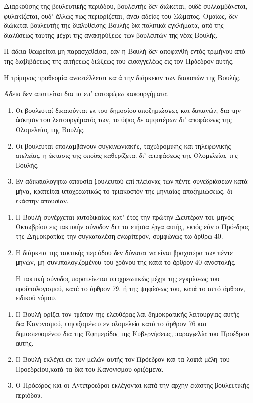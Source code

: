 \documentclass[twoside, a4paper, 10pt]{article}
\begin{document}
\begin{multicols}{2}
\begin{enumerate}
\begin{BigQuote}
Διαρκούσης της βουλευτικής περιόδου, βουλευτής δεν διώκεται, ουδέ συλλαμβάνεται, φυλακίζεται, ουδ' άλλως πως περιορίζεται, άνευ αδείας του Σώματος. Ομοίως, δεν διώκεται βουλευτής της διαλυθείσης Βουλής δια πολιτικά εγκλήματα, από της διαλύσεως ταύτης μέχρι της ανακηρύξεως των βουλευτών της νέας Βουλής.

Η άδεια θεωρείται μη παρασχεθείσα, εάν η Βουλή δεν αποφανθή εντός τριμήνου από της  διαβιβάσεως της αιτήσεως διώξεως του εισαγγελέως εις τον Πρόεδρον αυτής.

Η τρίμηνος προθεσμία αναστέλλεται κατά την διάρκειαν των διακοπών της Βουλής.

Άδεια δεν απαιτείται δια τα επ' αυτοφώρω κακουργήματα.

\begin{enumerate}
  \item[1.] Οι βουλευταί δικαιούνται εκ του δημοσίου αποζημιώσεως και δαπανών, δια την άσκησιν  του λειτουργήματός των, το ύψος δε αμφοτέρων δι' αποφάσεως της Ολομελείας της Βουλής.
  \item[2.] Οι βουλευταί απολαμβάνουν συγκινωνιακής, ταχυδρομικής και τηλεφωνικής ατελείας, η έκτασις της οποίας καθορίζεται δι' αποφάσεως της Ολομελείας της Βουλής.
  \item[3.] Εν αδικαιολογήτω απουσία βουλευτού επί πλείονας των πέντε συνεδριάσεων κατά μήνα, κρατείται υποχρεωτικώς το τριακοστόν της μηνιαίας αποζημιώσεως, δι εκάστην απουσίαν.
\end{enumerate}

\begin{enumerate}
  \item[1.] Η Βουλή συνέρχεται αυτοδικαίως κατ' έτος την πρώτην Δευτέραν του μηνός Οκτωβρίου εις τακτικήν σύνοδον δια τα ετήσια έργα αυτής, εκτός εάν ο Πρόεδρος της Δημοκρατίας την συγκαταλέση ενωρίτερον, συμφώνως τω άρθρω 40.
  \item[2.] Η διάρκεια της τακτικής περιόδου δεν δύναται να είναι βραχυτέρα των πέντε μηνών, μη συνυπολογιζομένου του χρόνου της κατά το άρθρον 40 αναστολής.

Η τακτική σύνοδος παρατείνεται υποχρεωτικώς μέχρι της εγκρίσεως του προϋπολογισμού, κατά το άρθρον 79, ή της ψηφίσεως του, κατά το αυτό άρθρον, ειδικού νόμου.
\end{enumerate}

\begin{enumerate}
  \item[1.] Η Βουλή ορίζει τον τρόπον της ελευθέρας λαι δημοκρατικής λειτουργίας αυτής δια Κανονισμού, ψηφιζομένου εν ολομελεία κατά το άρθρον 76 και δημοσιευομένου δια της  Εφημερίδος της Κυβερνήσεως, παραγγελία του Προέδρου αυτής.
  \item[2.] Η Βουλή εκλέγει εκ των μελών αυτής τον Πρόεδρον και τα λοιπά μέλη του Προεδρείου,κατά τα δια του Κανονισμού οριζόμενα.
  \item[3.] Ο Πρόεδρος και οι Αντιπρόεδροι εκλέγονται κατά την αρχήν εκάστης βουλευτικής περιόδου.


\end{enumerate}
\end{BigQuote}
\end{enumerate}
\end{multicols}
\end{document}
